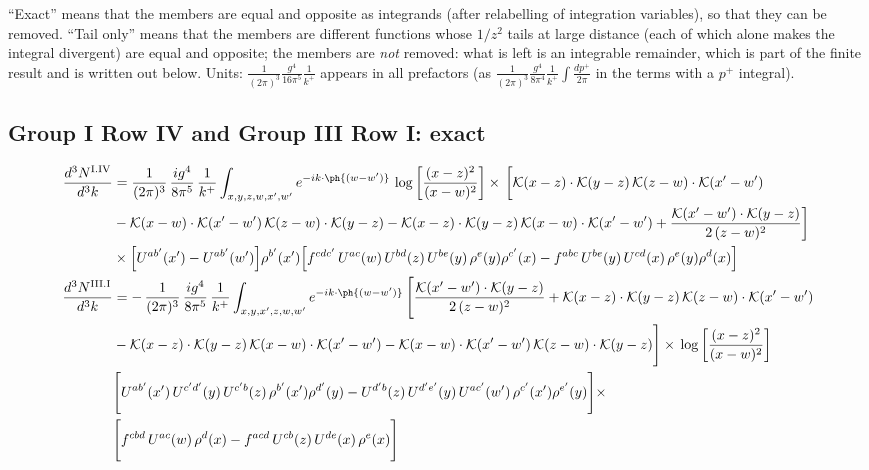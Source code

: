 ``Exact'' means that the members are equal and opposite as integrands (after relabelling of integration variables), so that they can be removed. ``Tail only'' means that the members are different functions whose $1/z^{2}$ tails at large distance (each of which alone makes the integral divergent) are equal and opposite; the members are \emph{not} removed: what is left is an integrable remainder, which is part of the finite result and is written out below. Units: $\frac{1}{(2\pi)^{3}}\frac{g^{4}}{16\pi^{5}}\frac{1}{k^{+}}$ appears in all prefactors (as $\frac{1}{(2\pi)^{3}}\frac{g^{4}}{8\pi^{4}}\frac{1}{k^{+}}\int\frac{dp^{+}}{2\pi}$ in the terms with a $p^{+}$ integral).

\subsection{Group I Row IV and Group III Row I: exact}\label{sec:C1}
\begingroup\color{cI4}
\begin{align}
\frac{d^{3}N^{\rm I.IV}}{d^{3}k} & = \frac{1}{(2\pi)^{3}}\,\frac{ig^{4}}{8\pi^{5}}\,\frac{1}{k^{+}}\int_{x,y,z,w,x',w'}e^{-ik\cdot\ph{(w-w')}}\,\log\left[\frac{(x-z)^{2}}{(x-w)^{2}}\right]\times\,\bigg[\mathcal{K}(x-z)\cdot\mathcal{K}(y-z)\,\mathcal{K}(z-w)\cdot\mathcal{K}(x'-w')\notag \\ & -\mathcal{K}(x-w)\cdot\mathcal{K}(x'-w')\,\mathcal{K}(z-w)\cdot\mathcal{K}(y-z)-\mathcal{K}(x-z)\cdot\mathcal{K}(y-z)\,\mathcal{K}(x-w)\cdot\mathcal{K}(x'-w')+\frac{\mathcal{K}(x'-w')\cdot\mathcal{K}(y-z)}{2\,(z-w)^{2}}\bigg]\notag \\ & \times\Big[U^{ab'}(x')-U^{ab'}(w')\Big]\rho^{b'}(x')\Big[f^{cdc'}\,U^{ac}(w)\,U^{bd}(z)\,U^{be}(y)\,\rho^{e}(y)\rho^{c'}(x)-f^{abc}\,U^{be}(y)\,U^{cd}(x)\,\rho^{e}(y)\rho^{d}(x)\Big]\label{eq:C-I4}\\
\frac{d^{3}N^{\rm III.I}}{d^{3}k} & = -\,\frac{1}{(2\pi)^{3}}\,\frac{ig^{4}}{8\pi^{5}}\,\frac{1}{k^{+}}\int_{x,y,x',z,w,w'} e^{-ik\cdot\ph{(w-w')}}\,\Bigg[\frac{\mathcal{K}(x'-w')\cdot\mathcal{K}(y-z)}{2\,(z-w)^{2}}+\mathcal{K}(x-z)\cdot\mathcal{K}(y-z)\,\mathcal{K}(z-w)\cdot\mathcal{K}(x'-w')\notag \\
& -\mathcal{K}(x-z)\cdot\mathcal{K}(y-z)\,\mathcal{K}(x-w)\cdot\mathcal{K}(x'-w')-\mathcal{K}(x-w)\cdot\mathcal{K}(x'-w')\,\mathcal{K}(z-w)\cdot\mathcal{K}(y-z)\Bigg]\times\, \log\left[\frac{(x-z)^{2}}{(x-w)^{2}}\right]\notag \\
& \Bigg[U^{ab'}(x')\,U^{c'd'}(y)\,U^{c'b}(z)\,\rho^{b'}(x')\rho^{d'}(y)-U^{d'b}(z)\,U^{d'e'}(y)\,U^{ac'}(w')\,\rho^{c'}(x')\rho^{e'}(y)\Bigg]\times\notag \\ & \Bigg[f^{cbd}\,U^{ac}(w)\,\rho^{d}(x)-f^{acd}\, U^{cb}(z)\,U^{de}(x)\,\rho^{e}(x)\Bigg]\label{eq:C-III1}
\end{align}
